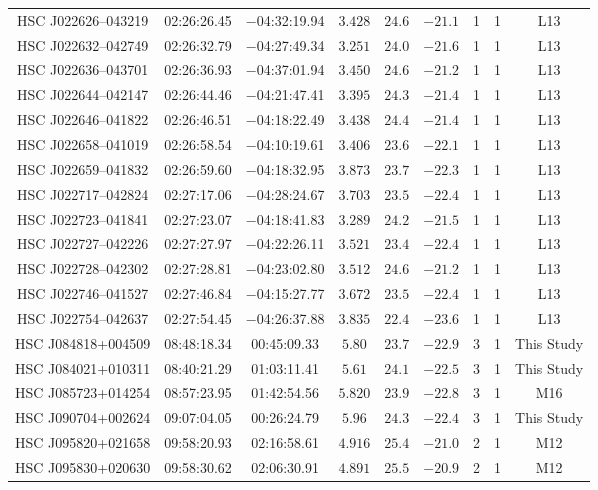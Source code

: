 \documentclass[]{pasj01}
\begin{document}
{\begin{longtable}{ccccccccc}
HSC J022626--043219 & 02:26:26.45 & $-$04:32:19.94 & $3.428$ & $24.6$ & $-21.1$ & 1 & 1 & L13 \\
HSC J022632--042749 & 02:26:32.79 & $-$04:27:49.34 & $3.251$ & $24.0$ & $-21.6$ & 1 & 1 & L13 \\
HSC J022636--043701 & 02:26:36.93 & $-$04:37:01.94 & $3.450$ & $24.6$ & $-21.2$ & 1 & 1 & L13 \\
HSC J022644--042147 & 02:26:44.46 & $-$04:21:47.41 & $3.395$ & $24.3$ & $-21.4$ & 1 & 1 & L13 \\
HSC J022646--041822 & 02:26:46.51 & $-$04:18:22.49 & $3.438$ & $24.4$ & $-21.4$ & 1 & 1 & L13 \\
HSC J022658--041019 & 02:26:58.54 & $-$04:10:19.61 & $3.406$ & $23.6$ & $-22.1$ & 1 & 1 & L13 \\
HSC J022659--041832 & 02:26:59.60 & $-$04:18:32.95 & $3.873$ & $23.7$ & $-22.3$ & 1 & 1 & L13 \\
HSC J022717--042824 & 02:27:17.06 & $-$04:28:24.67 & $3.703$ & $23.5$ & $-22.4$ & 1 & 1 & L13 \\
HSC J022723--041841 & 02:27:23.07 & $-$04:18:41.83 & $3.289$ & $24.2$ & $-21.5$ & 1 & 1 & L13 \\
HSC J022727--042226 & 02:27:27.97 & $-$04:22:26.11 & $3.521$ & $23.4$ & $-22.4$ & 1 & 1 & L13 \\
HSC J022728--042302 & 02:27:28.81 & $-$04:23:02.80 & $3.512$ & $24.6$ & $-21.2$ & 1 & 1 & L13 \\
HSC J022746--041527 & 02:27:46.84 & $-$04:15:27.77 & $3.672$ & $23.5$ & $-22.4$ & 1 & 1 & L13 \\
HSC J022754--042637 & 02:27:54.45 & $-$04:26:37.88 & $3.835$ & $22.4$ & $-23.6$ & 1 & 1 & L13 \\
HSC J084818+004509 &  08:48:18.34  &  00:45:09.33  &  $5.80$ & $23.7$ & $-22.9$ & 3 & 1 & This Study \\
HSC J084021+010311 &  08:40:21.29  &  01:03:11.41  & $5.61$ & $24.1$ & $-22.5$ & 3 & 1 & This Study \\
HSC J085723+014254 & 08:57:23.95 & 01:42:54.56 & $5.820$ & $23.9$ & $-22.8$ & 3 & 1 & M16 \\
HSC J090704+002624 &  09:07:04.05  &  00:26:24.79  &  $5.96$ & $24.3$ & $-22.4$ & 3 & 1 & This Study \\
HSC J095820+021658 & 09:58:20.93 & 02:16:58.61 & $4.916$ & $25.4$ & $-21.0$ & 2 & 1 & M12 \\
HSC J095830+020630 & 09:58:30.62 & 02:06:30.91 & $4.891$ & $25.5$ & $-20.9$ & 2 & 1 & M12 \\

\end{longtable}}
\end{document}
